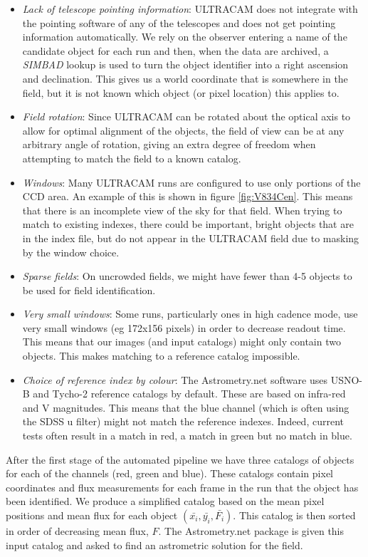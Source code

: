 \begin{itemize}
	\item \emph{Lack of telescope pointing information}: ULTRACAM does not integrate with the pointing software of any of the telescopes and does not get pointing information automatically. We rely on the observer entering a name of the candidate object for each run and then, when the data are archived, a \emph{SIMBAD} lookup is used to turn the object identifier into a right ascension and declination. This gives us a world coordinate that is somewhere in the field, but it is not known which object (or pixel location) this applies to.  
	\item \emph{Field rotation}: Since ULTRACAM can be rotated about the optical axis to allow for optimal alignment of the objects, the field of view can be at any arbitrary angle of rotation, giving an extra degree of freedom when attempting to match the field to a known catalog. 
	\item \emph{Windows}: Many ULTRACAM runs are configured to use only portions of the CCD area. An example of this is shown in figure \ref{fig:V834Cen}. This means that there is an incomplete view of the sky for that field. When trying to match to existing indexes, there could be important, bright objects that are in the index file, but do not appear in the ULTRACAM field due to masking by the window choice.
	\item \emph{Sparse fields}: On uncrowded fields, we might have fewer than 4-5 objects to be used for field identification. 
	\item \emph{Very small windows}: Some runs, particularly ones in high cadence mode, use very small windows (eg 172x156 pixels) in order to decrease readout time. This means that our images (and input catalogs) might only contain two objects. This makes matching to a reference catalog impossible. 
	\item \emph{Choice of reference index by colour}: The Astrometry.net software uses USNO-B and Tycho-2 reference catalogs by default. These are based on infra-red and V magnitudes. This means that the blue channel (which is often using the SDSS u filter) might not match the reference indexes. Indeed, current tests often result in a match in red, a match in green but no match in blue. 
\end{itemize}

After the first stage of the automated pipeline we have three catalogs of objects for each of the channels (red, green and blue). These catalogs contain pixel coordinates and flux measurements for each frame in the run that the object has been identified. We produce a simplified catalog based on the mean pixel positions and mean flux for each object $(\bar{x_i}, \bar{y_i}, \bar{F_i})$. This catalog is then sorted in order of decreasing mean flux, $F$. The Astrometry.net package is given this input catalog and asked to find an astrometric solution for the field. 

